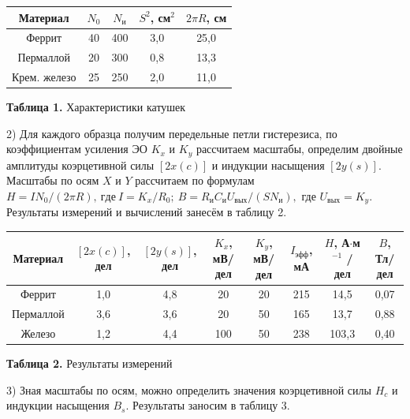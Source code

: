 \documentclass{article}
\begin{document}
\begin{center}
    \begin{tabular}{|c|c|c|c|c|}
		\hline
		Материал     & $N_0$ & $N_\text{и}$ & $S^2$, см$^2$ & $2\pi R$, см \\ \hline
		Феррит       & 40    & 400          & 3,0           & 25,0         \\ \hline
		Пермаллой    & 20    & 300          & 0,8           & 13,3         \\ \hline
		Крем. железо & 25    & 250          & 2,0           & 11,0         \\ \hline
	\end{tabular}
	
	\textbf{Таблица 1.} Характеристики катушек
\end{center}

2) Для каждого образца получим передельные петли гистерезиса, по коэффициентам усиления ЭО $K_x$ и $K_y$ рассчитаем масштабы, определим двойные амплитуды коэрцетивной силы $ [2x(c)] $ и индукции насыщения $ [2y(s)] $. Масштабы по осям $ X $ и $ Y $ рассчитаем по формулам  $H=IN_0/(2\pi R),\ где\ I=K_x/R_0;\ B=R_\text{и}C_\text{и}U_{\text{вых}}/(SN_\text{и}),$ где $U_{\text{вых}}=K_y$. Результаты измерений и вычислений занесём в таблицу 2.

\begin{center}
    \begin{tabular}[width = 0.6\textwidth]{|c|c|c|c|c|c|c|c|}
		\hline
		Материал     & $[2x(c)]$, дел & $[2y(s)]$, дел & $K_x$, мВ/дел & $K_y$, мВ/дел & $I_\text{эфф}$, мА & $H$, А$\cdot$м$^{-1}$ / дел & $B$, Тл/дел  \\ \hline
		Феррит       & 1,0            & 4,8            & 20            & 20            & 
		215                & 14,5                        & 0,07         \\ \hline
		Пермаллой    & 3,6            & 3,6            & 20            & 50            & 
		165                & 13,7                        & 0,88         \\ \hline
		Железо & 1,2            & 4,4            & 100           & 50            & 
		238                & 103,3                       & 0,40         \\ \hline
	\end{tabular} 
	
	\textbf{Таблица 2.} Результаты измерений
\end{center}

3) Зная масштабы по осям, можно определить значения коэрцетивной силы $ H_c $ и индукции насыщения $ B_s $. Результаты заносим в таблицу 3.
\end{document}
